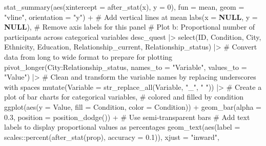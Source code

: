 \documentclass[
  bookmarksnumbered]{article}
\newenvironment{Shaded}{\begin{snugshade}}{\end{snugshade}}
\newcommand{\AttributeTok}[1]{\textcolor[rgb]{0.80,0.80,0.80}{#1}}
\newcommand{\CommentTok}[1]{\textcolor[rgb]{0.50,0.62,0.50}{#1}}
\newcommand{\ConstantTok}[1]{\textcolor[rgb]{0.86,0.64,0.64}{\textbf{#1}}}
\newcommand{\DecValTok}[1]{\textcolor[rgb]{0.86,0.86,0.80}{#1}}
\newcommand{\FloatTok}[1]{\textcolor[rgb]{0.75,0.75,0.82}{#1}}
\newcommand{\FunctionTok}[1]{\textcolor[rgb]{0.94,0.94,0.56}{#1}}
\newcommand{\NormalTok}[1]{\textcolor[rgb]{0.80,0.80,0.80}{#1}}
\newcommand{\SpecialCharTok}[1]{\textcolor[rgb]{0.86,0.64,0.64}{#1}}
\newcommand{\StringTok}[1]{\textcolor[rgb]{0.80,0.58,0.58}{#1}}
\begin{document}
\begin{Shaded}
\begin{Highlighting}[]
    \FunctionTok{stat\_summary}\NormalTok{(}\FunctionTok{aes}\NormalTok{(}\AttributeTok{xintercept =} \FunctionTok{after\_stat}\NormalTok{(x), }\AttributeTok{y =} \DecValTok{0}\NormalTok{),}
                 \AttributeTok{fun =}\NormalTok{ mean, }\AttributeTok{geom =} \StringTok{"vline"}\NormalTok{, }\AttributeTok{orientation =} \StringTok{"y"}\NormalTok{) }\SpecialCharTok{+}  \CommentTok{\# Add vertical lines at mean}
    \FunctionTok{labs}\NormalTok{(}\AttributeTok{x =} \ConstantTok{NULL}\NormalTok{, }\AttributeTok{y =} \ConstantTok{NULL}\NormalTok{),  }\CommentTok{\# Remove axis labels for this panel}
  \CommentTok{\# Plot b: Proportional number of participants across categorical variables}
\NormalTok{  desc\_quest }\SpecialCharTok{|\textgreater{}} 
    \FunctionTok{select}\NormalTok{(ID, Condition, City, Ethnicity, }
\NormalTok{           Education, Relationship\_current, Relationship\_status) }\SpecialCharTok{|\textgreater{}} 
    \CommentTok{\# Convert data from long to wide format to prepare for plotting}
    \FunctionTok{pivot\_longer}\NormalTok{(City}\SpecialCharTok{:}\NormalTok{Relationship\_status,}
                 \AttributeTok{names\_to =} \StringTok{"Variable"}\NormalTok{,}
                 \AttributeTok{values\_to =} \StringTok{"Value"}\NormalTok{) }\SpecialCharTok{|\textgreater{}} 
    \CommentTok{\# Clean and transform the variable names by replacing underscores with spaces}
    \FunctionTok{mutate}\NormalTok{(}\AttributeTok{Variable =} \FunctionTok{str\_replace\_all}\NormalTok{(Variable, }\StringTok{"\_"}\NormalTok{, }\StringTok{" "}\NormalTok{)) }\SpecialCharTok{|\textgreater{}} 
    \CommentTok{\# Create a plot of bar charts for categorical variables, }
    \CommentTok{\# colored and filled by condition}
    \FunctionTok{ggplot}\NormalTok{(}\FunctionTok{aes}\NormalTok{(}\AttributeTok{y =}\NormalTok{ Value, }\AttributeTok{fill =}\NormalTok{ Condition, }\AttributeTok{color =}\NormalTok{ Condition)) }\SpecialCharTok{+}
    \FunctionTok{geom\_bar}\NormalTok{(}\AttributeTok{alpha =} \FloatTok{0.3}\NormalTok{, }\AttributeTok{position =} \FunctionTok{position\_dodge}\NormalTok{()) }\SpecialCharTok{+}  \CommentTok{\# Use semi{-}transparent bars}
    \CommentTok{\# Add text labels to display proportional values as percentages}
    \FunctionTok{geom\_text}\NormalTok{(}\FunctionTok{aes}\NormalTok{(}\AttributeTok{label =}\NormalTok{ scales}\SpecialCharTok{::}\FunctionTok{percent}\NormalTok{(}\FunctionTok{after\_stat}\NormalTok{(prop), }\AttributeTok{accuracy =} \FloatTok{0.1}\NormalTok{)),}
              \AttributeTok{xjust =} \StringTok{"inward"}\NormalTok{,}

\end{Highlighting}
\end{Shaded}
\end{document}
